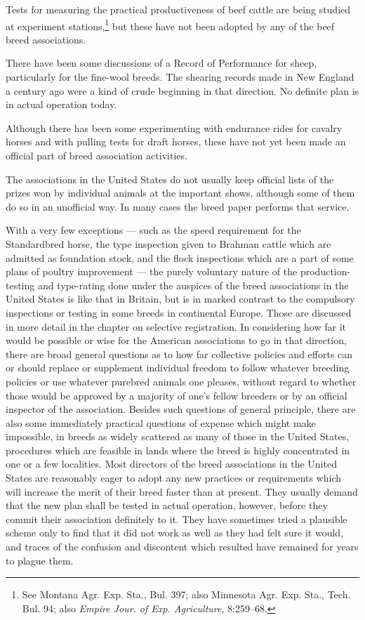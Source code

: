 Tests for measuring the practical productiveness of beef cattle are being studied at experiment stations,\footnote{See Montana
Agr. Exp. Sta., Bul. 397; also Minnesota Agr. Exp. Sta., Tech. Bul. 94; also \textit{Empire Jour. of Exp. Agriculture},
8:259--68.} but these have not been adopted by any of the beef breed associations.

There have been some discussions of a Record of Performance for sheep, particularly for the fine-wool breeds. The shearing 
records made in New England a century ago were a kind of crude beginning in that direction. No definite plan is in actual 
operation today.

Although there has been some experimenting with endurance rides for cavalry horses and with pulling tests for draft horses, 
these have not yet been made an official part of breed association activities.

The associations in the United States do not usually keep official lists of the prizes won by individual animals at the 
important shows, although some of them do so in an unofficial way. In many cases the breed paper performs that service.

With a very few exceptions --- such as the speed requirement for the Standardbred horse, the type inspection given to Brahman cattle which are admitted as foundation stock, and the flock inspections which are a part of some plans of poultry improvement --- the purely voluntary nature of the production-testing and type-rating done under the auspices of the breed associations in the United States is like that in Britain, but is in marked contrast to the compulsory inspections or testing
in some breeds in continental Europe. Those are discussed in more detail in the chapter on selective registration. In considering how far it would be possible or wise for the American associations to go in that direction, there are broad general questions as to how far collective policies and efforts can or should replace or supplement individual freedom
to follow whatever breeding policies or use whatever purebred animals one pleases, without regard to whether those would be
approved by a majority of one's fellow breeders or by an official inspector of the association. Besides such questions of 
general principle, there are also some immediately practical questions of expense which might make impossible, in breeds as 
widely scattered as many of those in the United States, procedures which are feasible in lands where the breed is highly 
concentrated in one or a few localities. Most directors of the breed associations in the United States are reasonably eager 
to adopt any new practices or requirements which will increase the merit of their breed faster than at present. They 
usually demand that the new plan shall be tested in actual operation, however, before they commit their association 
definitely to it. They have sometimes tried a plausible scheme only to find that it did not work as well as they had felt 
sure it would, and traces of the confusion and discontent which resulted have remained for years to plague them.

